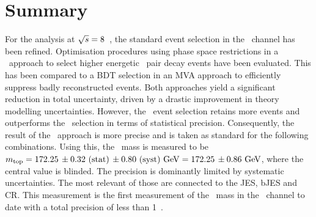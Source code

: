 \section{Summary}
%
For the analysis at ${\sqrt{s}}=8$~\TeV, the standard event selection in the \ttbarll\ channel has been refined.
%
Optimisation procedures using phase space restrictions in a \cutbased\ approach to select higher energetic \tquark\ pair decay events have been evaluated. This has been compared to a \gls{BDT} selection in an \gls{MVA} approach to efficiently suppress badly reconstructed events.
%
Both approaches yield a significant reduction in total uncertainty, driven by a drastic improvement in theory modelling uncertainties. However, the \mvabased\ event selection retains more events and outperforms the \cutbased\ selection in terms of statistical precision. 
%
%
Consequently, the result of the \mvabased\ approach is more precise and is taken as standard for the following combinations.
%
Using this, the \tquark\ mass is measured to be $m_{\mathrm{top}} = 172.25\,\pm 0.32~\mathrm{(stat)}\,\pm 0.80~\mathrm{(syst)}~\mathrm{GeV}=172.25\,\pm 0.86~\mathrm{GeV}$, where the central value is blinded. %
%
The precision is dominantly limited by systematic uncertainties. The most relevant of those are connected to the \gls{JES}, \gls{bJES} and \gls{CR}. 
%
This measurement is the first measurement of the \tquark\ mass in the \ttbarll\ channel to date with a total precision of less than 1~\GeV.







